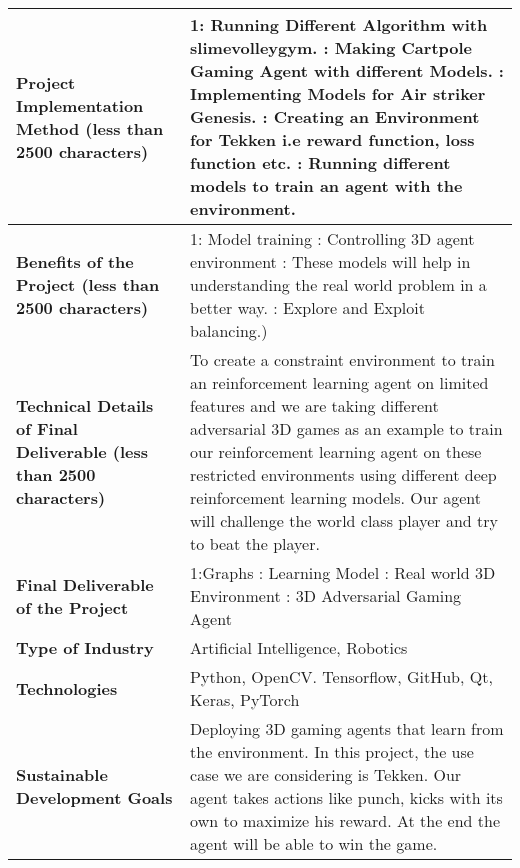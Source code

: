 \documentclass{article} %
\begin{document}
			\begin{tabular}{|p{1.6in}|p{1.0in}|p{0.9in}|p{3.9in}|} \hline  
		\textbf{Project Implementation Method (less than 2500 characters)} & \multicolumn{3}{|p{3.2in}|}{1: Running Different Algorithm with slimevolleygym. \newline 2: Making Cartpole  Gaming Agent with different Models. \newline 3: Implementing Models for Air striker Genesis. \newline 4: Creating an Environment for Tekken i.e reward function, loss function etc. \newline 5: Running different models to train an agent with the environment.
		} \\ \hline 
		\textbf{Benefits of the Project (less than 2500 characters)} & \multicolumn{3}{|p{3.2in}|}{1: Model training \newline 2: Controlling 3D agent environment \newline 3: These models will help in understanding the real world problem in a better way. \newline 4: Explore and Exploit balancing.) } \\ \hline 
		\textbf{Technical Details of Final Deliverable (less than 2500 characters)} & \multicolumn{3}{|p{3.2in}|}{To create a constraint environment to train an reinforcement learning agent on limited features and we are taking different adversarial 3D games as an example to train our reinforcement learning agent on these restricted environments using different deep reinforcement learning models. Our agent will challenge the world class player and try to beat the player.
		} \\ \hline 
		\textbf{Final Deliverable of the Project} & \multicolumn{3}{|p{3.2in}|}{1:Graphs \newline 2: Learning Model \newline 3: Real world 3D Environment \newline 4: 3D Adversarial Gaming Agent 
		} \\ \hline 
		\textbf{Type of Industry} & \multicolumn{3}{|p{3.2in}|}{Artificial Intelligence, Robotics} \\ \hline 
		\textbf{Technologies} & \multicolumn{3}{|p{3.2in}|}{Python, OpenCV. Tensorflow, GitHub, Qt, Keras, PyTorch} \\ \hline 
		\textbf{Sustainable Development Goals} & \multicolumn{3}{|p{3.2in}|}{
			Deploying 3D gaming agents that learn from the environment. In this project, the use case  we are considering is Tekken. Our agent takes actions like punch, kicks with its own to maximize his reward. At the end the agent will be able to win the game.
		} \\ \hline 
	\end{tabular}
	
\end{document}
